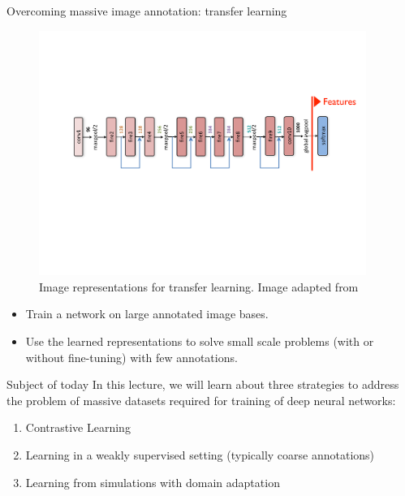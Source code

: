 \documentclass[xcolor=pdftex,dvipsnames,table]{beamer}
\begin{document}
\begin{frame}{Overcoming massive image annotation: transfer learning}
\begin{figure}[htb]
   \centering
   \includegraphics[width=0.95\textwidth]{../graphics/transfer_learning.pdf}
   \caption{Image representations for transfer learning. Image adapted from \cite{Iandola:2017}}
\end{figure}
\begin{itemize}
   \item Train a network on large annotated image bases.
   \item Use the learned representations to solve small scale problems (with or without fine-tuning) with few annotations.
\end{itemize}
\end{frame}


\begin{frame}{Subject of today}
In this lecture, we will learn about three strategies to address the problem of massive datasets required for training of deep neural networks:
\begin{enumerate}
\item Contrastive Learning
\item Learning in a weakly supervised setting (typically coarse annotations)
\item Learning from simulations with domain adaptation
\end{enumerate}
\end{frame}

\end{document}
